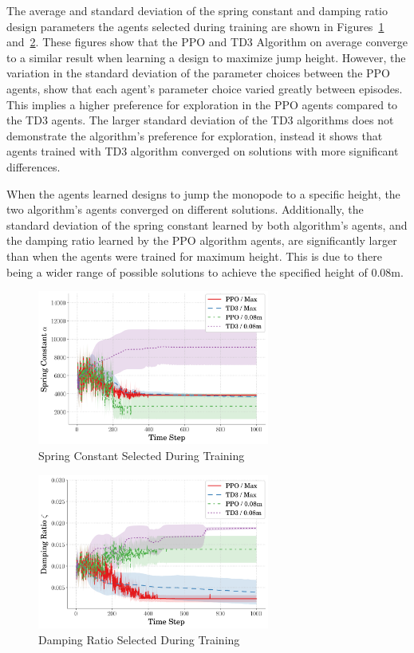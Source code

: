\documentclass[10pt,twocolumn,letterpaper]{article}
\begin{document}
The average and standard deviation of the spring constant and damping ratio design parameters the agents selected during training are shown in Figures~\ref{fig:spring_vs_step} and~\ref{fig:zeta_vs_step}. These figures show that the PPO and TD3 Algorithm on average converge to a similar result when learning a design to maximize jump height. However, the variation in the standard deviation of the parameter choices between the PPO agents, show that each agent's parameter choice varied greatly between episodes. This implies a higher preference for exploration in the PPO agents compared to the TD3 agents. The larger standard deviation of the TD3 algorithms does not demonstrate the algorithm's preference for exploration, instead it shows that agents trained with TD3 algorithm converged on solutions with more significant differences.

When the agents learned designs to jump the monopode to a specific height, the two algorithm's agents converged on different solutions. Additionally, the standard deviation of the spring constant learned by both algorithm's agents, and the damping ratio learned by the PPO algorithm agents, are significantly larger than when the agents were trained for maximum height. This is due to there being a wider range of possible solutions to achieve the specified height of 0.08m.
%
\begin{figure}[tb]
\begin{center}
        \includegraphics[width = 3in]{figures/ppo_vs_td3/avg_spring_comp.png}
        \caption{Spring Constant Selected During Training}
        \label{fig:spring_vs_step}
\end{center}
\end{figure}
%
\begin{figure}[tb]
        \begin{center}
                \includegraphics[width = 3in]{figures/ppo_vs_td3/avg_zeta_comp.png}
                \caption{Damping Ratio Selected During Training}
                \label{fig:zeta_vs_step}
        \end{center}
\end{figure}
\end{document}
